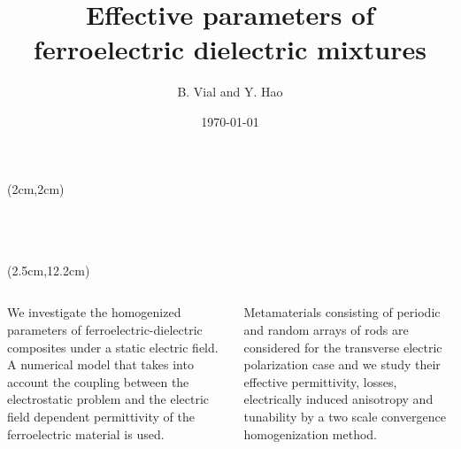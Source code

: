 \documentclass[final,12pt]{beamer} %
\begin{document}
\color{fresnelblack}
\date{\today}
\title{Effective parameters of ferroelectric dielectric mixtures}
\subtitle{}
\author{B. Vial and Y. Hao }

\begin{frame}


\begin{textblock*}{80cm}(2cm,2cm)
{\hfill \blackfont\fontsize{1.9cm}{1em}\selectfont \textcolor{fresnelorange}{\MakeUppercase{\inserttitle}}\\}\vspace*{2em}
{\hfill \textcolor{white}{\Large\insertauthor}\\}
\vspace*{16pt}
{\hfill \itshape\large\textcolor{white}{
School of Electronic Engineering \& Computer Science, Queen Mary, University of London}}
\end{textblock*}


\begin{textblock*}{79.5cm}(2.5cm,12.2cm)
{ \vspace{0.5em}
  \large \itshape
  \begin{columns}[t,totalwidth=\columnwidth]

  \begin{column}{.48\columnwidth}
    We investigate the homogenized parameters of ferroelectric-dielectric composites under a static electric field. A numerical model that takes into account the coupling
    between the electrostatic problem and the electric field dependent permittivity of the
    ferroelectric material is used.
  \end{column}

  \begin{column}{.48\columnwidth}
    Metamaterials consisting of periodic and random arrays of rods
      are considered for the transverse electric polarization case
      and we study their effective permittivity, losses, electrically induced anisotropy
      and tunability by a two scale convergence homogenization method.
  \end{column}

\end{columns}

}
\end{textblock*}
\end{frame}
\end{document}
